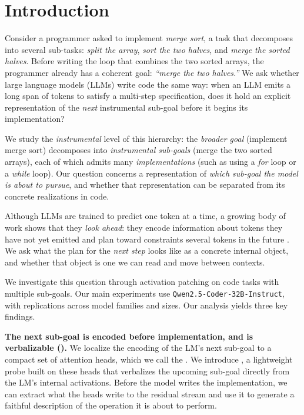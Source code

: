 \section{Introduction}
\label{sec:intro}


Consider a programmer asked to implement \emph{merge sort}, a task that decomposes into several sub-tasks: \emph{split the array}, \emph{sort the two halves}, and \emph{merge the sorted halves}. Before writing the loop that combines the two sorted arrays, the programmer already has a coherent goal: \textit{``merge the two halves.''} We ask whether large language models (LLMs) write code the same way: when an LLM emits a long span of tokens to satisfy a multi-step specification, does it hold an explicit representation of the \emph{next} instrumental sub-goal before it begins its implementation?

We study the \emph{instrumental} level of this hierarchy: the \emph{broader goal} (implement merge sort) decomposes into \emph{instrumental sub-goals} (merge the two sorted arrays), each of which admits many \emph{implementations} (such as using a \emph{for} loop or a \emph{while} loop). Our question concerns a representation of \emph{which sub-goal the model is about to pursue}, and whether that representation can be separated from its concrete realizations in code.

Although LLMs are trained to predict one token at a time, a growing body of work shows that they \emph{look ahead}: they encode information about tokens they have not yet emitted \citep{pal2023futurelens} and plan toward constraints several tokens in the future \citep{lindsey2025biology}. We ask what the plan for the \emph{next step} looks like as a concrete internal object, and whether that object is one we can read and move between contexts.

We investigate this question through activation patching on code tasks with multiple sub-goals. Our main experiments use \texttt{Qwen2.5-Coder-32B-Instruct}, with replications across model families and sizes. Our analysis yields three key findings.

\textbf{The next sub-goal is encoded before implementation, and is verbalizable ().} We localize the encoding of the LM's next sub-goal to a compact set of attention heads, which we call the \goalheads. We introduce \goalscope, a lightweight probe built on these heads that verbalizes the upcoming sub-goal directly from the LM's internal activations. Before the model writes the implementation, we can extract what the heads write to the residual stream and use it to generate a faithful description of the operation it is about to perform.

